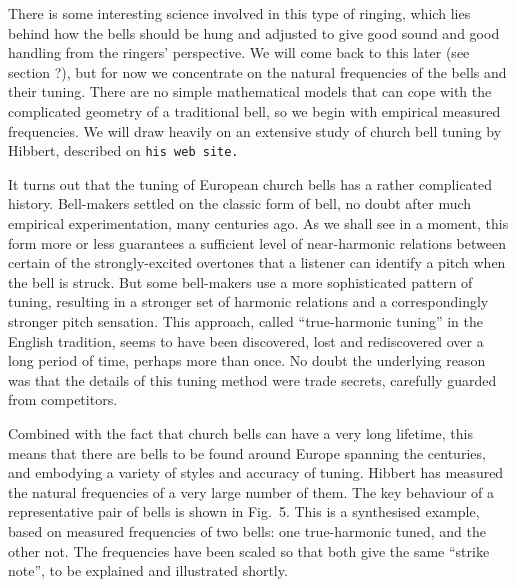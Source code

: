 

  There is some interesting science involved in this type of ringing, which 
  lies behind how the bells should be hung and adjusted to give good sound and 
  good handling from the ringers' perspective. We will come back to this later 
  (see section ?), but for now we concentrate on the natural frequencies of the 
  bells and their tuning. There are no simple mathematical models that can cope 
  with the complicated geometry of a traditional bell, so we begin with 
  empirical measured frequencies. We will draw heavily on an extensive study of 
  church bell tuning by Hibbert, described on \tt{}his web site\rm{}. 

  It turns out that the tuning of European church bells has a rather 
  complicated history. Bell-makers settled on the classic form of bell, no 
  doubt after much empirical experimentation, many centuries ago. As we shall 
  see in a moment, this form more or less guarantees a sufficient level of 
  near-harmonic relations between certain of the strongly-excited overtones 
  that a listener can identify a pitch when the bell is struck. But some 
  bell-makers use a more sophisticated pattern of tuning, resulting in a 
  stronger set of harmonic relations and a correspondingly stronger pitch 
  sensation. This approach, called ``true-harmonic tuning'' in the English 
  tradition, seems to have been discovered, lost and rediscovered over a long 
  period of time, perhaps more than once. No doubt the underlying reason was 
  that the details of this tuning method were trade secrets, carefully guarded 
  from competitors. 

  Combined with the fact that church bells can have a very long lifetime, this 
  means that there are bells to be found around Europe spanning the centuries, 
  and embodying a variety of styles and accuracy of tuning. Hibbert has 
  measured the natural frequencies of a very large number of them. The key 
  behaviour of a representative pair of bells is shown in Fig.\ 5. This is a 
  synthesised example, based on measured frequencies of two bells: one 
  true-harmonic tuned, and the other not. The frequencies have been scaled so 
  that both give the same ``strike note'', to be explained and illustrated 
  shortly. 


